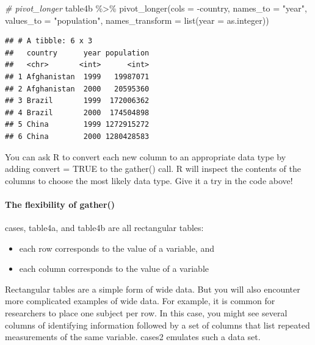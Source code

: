 \documentclass[
]{article}
\newenvironment{Shaded}{\begin{snugshade}}{\end{snugshade}}
\newcommand{\AttributeTok}[1]{\textcolor[rgb]{0.77,0.63,0.00}{#1}}
\newcommand{\CommentTok}[1]{\textcolor[rgb]{0.56,0.35,0.01}{\textit{#1}}}
\newcommand{\FunctionTok}[1]{\textcolor[rgb]{0.00,0.00,0.00}{#1}}
\newcommand{\NormalTok}[1]{#1}
\newcommand{\SpecialCharTok}[1]{\textcolor[rgb]{0.00,0.00,0.00}{#1}}
\newcommand{\StringTok}[1]{\textcolor[rgb]{0.31,0.60,0.02}{#1}}
\providecommand{\tightlist}{%
  \setlength{\itemsep}{0pt}\setlength{\parskip}{0pt}}
\begin{document}
\begin{Shaded}
\begin{Highlighting}[]
\CommentTok{\# pivot\_longer}
\NormalTok{table4b }\SpecialCharTok{\%\textgreater{}\%} \FunctionTok{pivot\_longer}\NormalTok{(}\AttributeTok{cols =} \SpecialCharTok{{-}}\NormalTok{country, }\AttributeTok{names\_to =} \StringTok{"year"}\NormalTok{, }\AttributeTok{values\_to =} \StringTok{"population"}\NormalTok{, }\AttributeTok{names\_transform =} \FunctionTok{list}\NormalTok{(}\AttributeTok{year =}\NormalTok{ as.integer))}
\end{Highlighting}
\end{Shaded}

\begin{verbatim}
## # A tibble: 6 x 3
##   country      year population
##   <chr>       <int>      <int>
## 1 Afghanistan  1999   19987071
## 2 Afghanistan  2000   20595360
## 3 Brazil       1999  172006362
## 4 Brazil       2000  174504898
## 5 China        1999 1272915272
## 6 China        2000 1280428583
\end{verbatim}

You can ask R to convert each new column to an appropriate data type by
adding convert = TRUE to the gather() call. R will inspect the contents
of the columns to choose the most likely data type. Give it a try in the
code above!

\hypertarget{the-flexibility-of-gather}{%
\paragraph{The flexibility of
gather()}\label{the-flexibility-of-gather}}

cases, table4a, and table4b are all rectangular tables:

\begin{itemize}
\tightlist
\item
  each row corresponds to the value of a variable, and
\item
  each column corresponds to the value of a variable
\end{itemize}

Rectangular tables are a simple form of wide data. But you will also
encounter more complicated examples of wide data. For example, it is
common for researchers to place one subject per row. In this case, you
might see several columns of identifying information followed by a set
of columns that list repeated measurements of the same variable. cases2
emulates such a data set.
\end{document}
